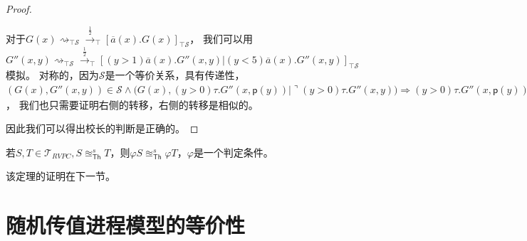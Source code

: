 \begin{proof}
\begin{itemize}
{         对于$G(x)\rightsquigarrow_{\top\mathcal{S}}\stackrel{\frac{1}{2}}{\rightarrow}_{\top} [\overline{a}(x).G(x)]_{\top\mathcal{S}}$，
         我们可以用$G''(x,y)\rightsquigarrow_{\top\mathcal{S}}\stackrel{\frac{1}{2}}{\rightarrow}_{\top}[(y>1)\overline{a}(x).G''(x,y)|(y<5)\overline{a}(x).G''(x,y)]_{\top\mathcal{S}}$模拟。
         对称的，因为$\mathcal{S}$是一个等价关系，具有传递性，$(G(x),G''(x,y))\in\mathcal{S}\wedge (G(x),(y>0)\tau.G''(x,\mathsf{p}(y))|\urcorner (y>0)\tau.G''(x,y))\Rightarrow (y>0)\tau.G''(x,\mathsf{p}(y))|\urcorner (y>0)\tau.G''(x,y)\in [G(x)]_{\top\mathcal{S}}$，
         我们也只需要证明右侧的转移，右侧的转移是相似的。
      }
   \end{itemize}
   因此我们可以得出校长的判断是正确的。
\end{proof}

\begin{theorem}
   若$S,T\in \mathcal{T}_{RVPC},S\approxeq^s_{\mathsf{Th}} T$，则$\varphi S \approxeq^s_{\mathsf{Th}} \varphi T$，$\varphi$是一个判定条件。
\end{theorem}
该定理的证明在下一节。

\section{随机传值进程模型的等价性}


